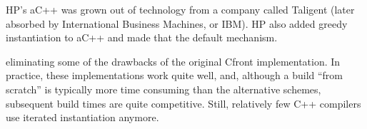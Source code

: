 \begin{tcolorbox}[colback=webgreen!5!white,colframe=webgreen!75!black]
\hspace*{0.75cm}HP’s aC++ was grown out of technology from a company called Taligent (later absorbed by International Business Machines, or IBM). HP also added greedy instantiation to aC++ and made that the default mechanism.
\end{tcolorbox}

eliminating some of the drawbacks of the original Cfront implementation. In practice, these implementations work quite well, and, although a build “from scratch” is typically more time consuming than the alternative schemes, subsequent build times are quite competitive. Still, relatively few C++ compilers use iterated instantiation anymore.
















